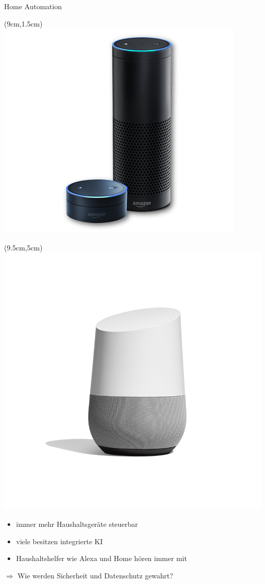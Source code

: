 \documentclass[10pt]{beamer}
\begin{document}
\begin{frame}{Home Automation}
	\begin{textblock*}{5cm}(9cm,1.5cm) %
		\includegraphics[scale=0.2]{./pics/alexa.png}
	\end{textblock*}
	\begin{textblock*}{5cm}(9.5cm,5cm) %
		\includegraphics[scale=0.1]{./pics/home.png}
	\end{textblock*}
	\begin{itemize}
		\item immer mehr Haushaltsgeräte steuerbar
		\item viele besitzen integrierte KI
		\item Haushaltshelfer wie Alexa und Home hören immer mit
	\end{itemize}
	\vspace{1cm}
	$\Rightarrow$ Wie werden Sicherheit und Datenschutz gewahrt?
\end{frame}
	
\end{document}
